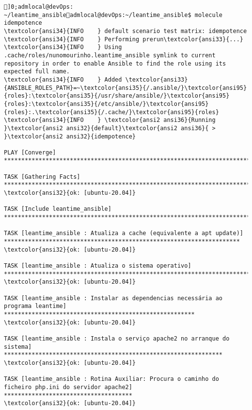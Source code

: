 \documentclass{scrartcl}
\begin{document}
\begin{Verbatim}
]0;admlocal@devOps: ~/leantime_ansibleadmlocal@devOps:~/leantime_ansible$ molecule idempotence
\textcolor{ansi34}{INFO    } default scenario test matrix: idempotence
\textcolor{ansi34}{INFO    } Performing prerun\textcolor{ansi33}{...}
\textcolor{ansi34}{INFO    } Using .cache/roles/nunomourinho.leantime_ansible symlink to current repository in order to enable Ansible to find the role using its expected full name.
\textcolor{ansi34}{INFO    } Added \textcolor{ansi33}{ANSIBLE_ROLES_PATH}=~\textcolor{ansi35}{/.ansible/}\textcolor{ansi95}{roles}:\textcolor{ansi35}{/usr/share/ansible/}\textcolor{ansi95}{roles}:\textcolor{ansi35}{/etc/ansible/}\textcolor{ansi95}{roles}:.\textcolor{ansi35}{/.cache/}\textcolor{ansi95}{roles}
\textcolor{ansi34}{INFO    } \textcolor{ansi2 ansi36}{Running }\textcolor{ansi2 ansi32}{default}\textcolor{ansi2 ansi36}{ > }\textcolor{ansi2 ansi32}{idempotence}

PLAY [Converge] **************************************************************************************************************************

TASK [Gathering Facts] *******************************************************************************************************************
\textcolor{ansi32}{ok: [ubuntu-20.04]}

TASK [Include leantime_ansible] **********************************************************************************************************

TASK [leantime_ansible : Atualiza a cache (equivalente a apt update)] ********************************************************************
\textcolor{ansi32}{ok: [ubuntu-20.04]}

TASK [leantime_ansible : Atualiza o sistema operativo] ***********************************************************************************
\textcolor{ansi32}{ok: [ubuntu-20.04]}

TASK [leantime_ansible : Instalar as dependencias necessária ao programa leantime] *******************************************************
\textcolor{ansi32}{ok: [ubuntu-20.04]}

TASK [leantime_ansible : Instala o serviço apache2 no arranque do sistema] ***************************************************************
\textcolor{ansi32}{ok: [ubuntu-20.04]}

TASK [leantime_ansible : Rotina Auxiliar: Procura o caminho do ficheiro php.ini do servidor apache2] *************************************
\textcolor{ansi32}{ok: [ubuntu-20.04]}


\end{Verbatim}
\end{document}
